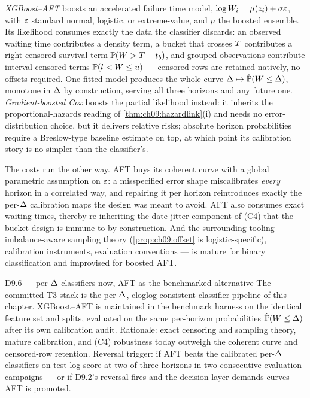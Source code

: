 \emph{XGBoost--AFT} \citep{barnwal2022} boosts an accelerated failure
time model, $\log W_i = \mu(z_i) + \sigma \varepsilon$, with $\varepsilon$
standard normal, logistic, or extreme-value, and $\mu$ the boosted
ensemble. Its likelihood consumes exactly the data the classifier
discards: an observed waiting time contributes a density term, a bucket
that crosses $T$ contributes a right-censored survival term
$\mathbb{P}(W > T - t_b)$, and grouped observations contribute
interval-censored terms $\mathbb{P}(l < W \le u)$ --- censored rows are
retained natively, no offsets required. One fitted model produces the
whole curve $\Delta \mapsto \hat{\mathbb{P}}(W \le \Delta)$, monotone in
$\Delta$ by construction, serving all three horizons and any future
one. \emph{Gradient-boosted Cox} \citep{polsterl2020} boosts the partial
likelihood instead: it inherits the proportional-hazards reading of
\cref{thm:ch09:hazardlink}(i) and needs no error-distribution choice,
but it delivers relative risks; absolute horizon probabilities require a
Breslow-type baseline estimate on top, at which point its calibration
story is no simpler than the classifier's.

The costs run the other way. AFT buys its coherent curve with a global
parametric assumption on $\varepsilon$: a misspecified error shape miscalibrates
\emph{every} horizon in a correlated way, and repairing it per horizon
reintroduces exactly the per-$\Delta$ calibration maps the design was
meant to avoid. AFT also consumes exact waiting times, thereby
re-inheriting the date-jitter component of (C4) that the bucket design
is immune to by construction. And the surrounding tooling ---
imbalance-aware sampling theory (\cref{prop:ch09:offset} is
logistic-specific), calibration instruments, evaluation conventions ---
is mature for binary classification and improvised for boosted AFT.

\begin{decision}{D9.6 --- per-$\Delta$ classifiers now, AFT as the
benchmarked alternative}
The committed T3 stack is the per-$\Delta$, cloglog-consistent
classifier pipeline of this chapter. XGBoost--AFT is maintained in the
benchmark harness on the identical feature set and splits, evaluated on
the same per-horizon probabilities $\hat{\mathbb{P}}(W \le \Delta)$ after its
own calibration audit. Rationale: exact censoring and sampling theory,
mature calibration, and (C4) robustness today outweigh the coherent
curve and censored-row retention. Reversal trigger: if AFT beats the
calibrated per-$\Delta$ classifiers on test log score at two of three
horizons in two consecutive evaluation campaigns --- or if D9.2's
reversal fires and the decision layer demands curves --- AFT is
promoted.
\end{decision}

